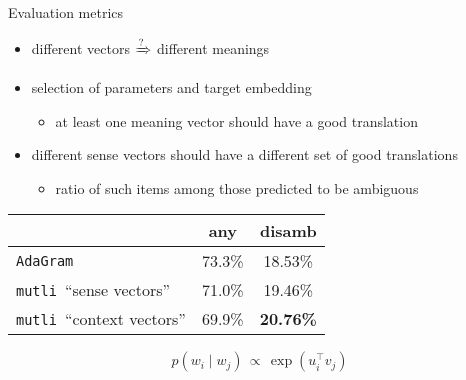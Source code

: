 \documentclass[10pt]{beamer}%
\newcommand{\bull}[1]{\begin{itemize}\item #1 \end{itemize}}
\newcommand{\adagram}{\texttt{AdaGram}}
\newcommand{\mutli}{\texttt{mutli}}
\begin{document}
\begin{frame}{Evaluation metrics}
  \begin{itemize}
    \item different vectors $ \xRightarrow ? $ different meanings
    \item selection of parameters and target embedding
      \bull{at least one meaning vector should have a good translation}
    \item different sense vectors should have a different set of good
      translations
        \bull{ratio of such items among those predicted to be ambiguous}
  \end{itemize}
\end{frame}
    \begin{frame}
      \begin{table}[allowframebreaks]
        \begin{tabular}{lcc}
          \toprule
                                    & any     & disamb \\
          \midrule
          \adagram                  & 73.3\%  & 18.53\% \\
          \mutli~``sense vectors''  & 71.0\%  & 19.46\% \\
          \mutli~``context vectors''& 69.9\%  & {\bf 20.76\%} \\
          \bottomrule
    \end{tabular}
  \end{table}
      \[p(w_i\mid w_j) \, \propto \, \exp (u_i ^\top v_j)\]
\end{frame}

\logo{}
\end{document}
